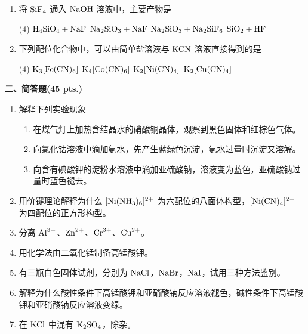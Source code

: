 \begin{enumerate}[label=\arabic*., itemsep=1.5ex]
    \item 将 $\ce{SiF4}$ 通入 $\ce{NaOH}$ 溶液中，主要产物是
    \begin{tasks}(4)
        \task $\ce{H4SiO4 + NaF}$
        \task $\ce{Na2SiO3 + NaF}$
        \task $\ce{Na2SiO3 + Na2SiF6}$
        \task $\ce{SiO2 + HF}$
    \end{tasks}

    \item 下列配位化合物中，可以由简单盐溶液与 $\ce{KCN}$ 溶液直接得到的是
    \begin{tasks}(4)
        \task $\ce{K3[Fe(CN)6]}$
        \task $\ce{K4[Co(CN)6]}$
        \task $\ce{K2[Ni(CN)4]}$
        \task $\ce{K2[Cu(CN)4]}$
    \end{tasks}
\end{enumerate}

\vspace{0.5cm}
\noindent\textbf{二、简答题(45 pts.)}

\begin{enumerate}[label=\arabic*., itemsep=1.5ex]
    \item 解释下列实验现象
    \begin{enumerate}[label=(\arabic*), noitemsep, topsep=0pt, partopsep=0pt]
        \item 在煤气灯上加热含结晶水的硝酸铜晶体，观察到黑色固体和红棕色气体。
        \item 向氯化钴溶液中滴加氨水，先产生蓝绿色沉淀，氨水过量时沉淀又溶解。
        \item 向含有碘酸钾的淀粉水溶液中滴加亚硫酸钠，溶液变为蓝色，亚硫酸钠过量时蓝色褪去。
    \end{enumerate}

    \item 用价键理论解释为什么 $[\ce{Ni(NH3)6}]^{2+}$ 为六配位的八面体构型，$[\ce{Ni(CN)4}]^{2-}$ 为四配位的正方形构型。

    \item 分离 $\ce{Al^{3+}}$、$\ce{Zn^{2+}}$、$\ce{Cr^{3+}}$、$\ce{Cu^{2+}}$。

    \item 用化学法由二氧化锰制备高锰酸钾。

    \item 有三瓶白色固体试剂，分别为 $\ce{NaCl}$，$\ce{NaBr}$，$\ce{NaI}$，试用三种方法鉴别。

    \item 解释为什么酸性条件下高锰酸钾和亚硝酸钠反应溶液褪色，碱性条件下高锰酸钾和亚硝酸钠反应溶液变绿。

    \item 在 $\ce{KCl}$ 中混有 $\ce{K2SO4}$，除杂。
\end{enumerate}

